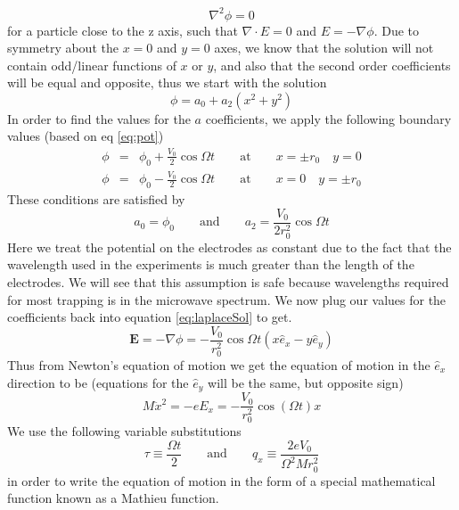 \documentclass[aps,prb,twocolumn,superscriptaddress]{revtex4-1}
\begin{document}
\begin{equation}
\nabla^2\phi=0
\end{equation}
for a particle close to the z axis, such that $\nabla\cdot E=0$ and $E=-\nabla\phi$. Due to symmetry about the $x=0$ and $y=0$ axes, we know that the solution will not contain odd/linear functions of $x$ or $y$, and also that the second order coefficients will be equal and opposite, thus we start with the solution
\begin{equation}
\phi=a_0+a_2\left(x^2+y^2\right)
\label{eq:laplaceSol}
\end{equation}
In order to find the values for the $a$ coefficients, we apply the following boundary values (based on eq \ref{eq:pot})
\begin{eqnarray}
\phi &=& \phi_0+\frac{V_0}{2}\cos{\Omega t}\qquad\text{at}\qquad x=\pm r_0\quad y=0\\
\phi &=& \phi_0-\frac{V_0}{2}\cos{\Omega t}\qquad\text{at}\qquad x=0\quad y=\pm r_0
\end{eqnarray}
These conditions are satisfied by
\begin{equation}
a_0 = \phi_0\qquad\text{and}\qquad a_2=\frac{V_0}{2r_0^2}\cos{\Omega t}
\end{equation}
Here we treat the potential on the electrodes as constant due to the fact that the wavelength used in the experiments is much greater than the length of the electrodes. We will see that this assumption is safe because wavelengths required for most trapping is in the microwave spectrum. We now plug our values for the coefficients back into equation \ref{eq:laplaceSol} to get.
\begin{equation}
\boldsymbol{E}=-\nabla\phi = -\frac{V_0}{r_0^2}\cos{\Omega t}\left(x\hat{e}_x-y\hat{e}_y\right)
\end{equation}
Thus from Newton's equation of motion we get the equation of motion in the $\hat{e}_x$ direction to be (equations for the $\hat{e}_y$ will be the same, but opposite sign)
\begin{equation}
M\ddot{x}^2=-eE_x=-\frac{V_0}{r_0^2}\cos\left(\Omega t\right)x
\end{equation}
We use the following variable substitutions
\begin{equation}
\tau\equiv\frac{\Omega t}{2}\qquad \text{and}\qquad q_x\equiv\frac{2eV_0}{\Omega^2Mr_0^2}
\end{equation}
in order to write the equation of motion in the form of a special mathematical function known as a Mathieu function.
\end{document}
